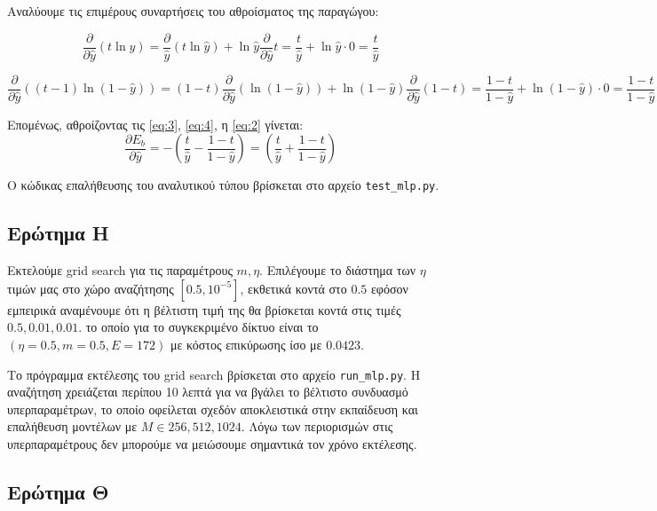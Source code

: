 \documentclass{article}
\newcommand{\code}{\texttt}
\begin{document}
Αναλύουμε τις επιμέρους συναρτήσεις του αθροίσματος της παραγώγου:

\begin{equation}
	\label{eq:3}
	\frac{\partial}{\partial \hat{y}} (t \ln\hat{y}) = \frac{\partial }{\hat{y}} (t\ln\hat{y}) + \ln\hat{y} \frac{\partial}{\partial \hat{y}}t = \frac{t}{\hat{y}} + \ln \hat{y} \cdot 0 = \frac{t}{\hat{y}}
\end{equation}

\begin{equation}
	\label{eq:4}
	\frac{\partial}{\partial \hat{y}} ((t-1) \ln(1-\hat{y})) = (1-t)\frac{\partial}{\partial\hat{y}} (\ln(1-\hat{y})) + \ln(1-\hat{y}) \frac{\partial}{\partial \hat{y}}(1-t) = \frac{1-t}{1-\hat{y}} + \ln(1-\hat{y}) \cdot 0 =\frac{1-t}{1-\hat{y}}
\end{equation}


Επομένως, αθροίζοντας τις \ref{eq:3}, \ref{eq:4}, η \ref{eq:2} γίνεται:
\begin{equation}
	\frac{\partial E_b}{\partial \hat{y}} = - (\frac{t}{\hat{y}} - \frac{1-t}{1-\hat{y}}) = (\frac{t}{\hat{y}} + \frac{1-t}{1 - \hat{y}})
\end{equation}

Ο κώδικας επαλήθευσης του αναλυτικού τύπου βρίσκεται στο αρχείο \code{test\_mlp.py}.


\subsection{Ερώτημα Η}

Εκτελούμε grid search για τις παραμέτρους $m, \eta$. Επιλέγουμε το διάστημα των $\eta$ τιμών μας στο χώρο αναζήτησης $[0.5, 10^{-5}]$, εκθετικά κοντά στο $0.5$ εφόσον εμπειρικά αναμένουμε ότι η βέλτιστη τιμή της θα βρίσκεται κοντά στις τιμές $0.5, 0.01, 0.01$.  το οποίο για το συγκεκριμένο δίκτυο είναι το $(\eta=0.5, m=0.5, E=172)$ με κόστος επικύρωσης ίσο με $0.0423$.

Το πρόγραμμα εκτέλεσης του grid search βρίσκεται στο αρχείο \code{run\_mlp.py}. Η αναζήτηση χρειάζεται περίπου 10 λεπτά για να βγάλει το βέλτιστο συνδυασμό υπερπαραμέτρων, το οποίο οφείλεται σχεδόν αποκλειστικά στην εκπαίδευση και επαλήθευση μοντέλων με $M \in {256, 512, 1024}$. Λόγω των περιορισμών στις υπερπαραμέτρους δεν μπορούμε να μειώσουμε σημαντικά τον χρόνο εκτέλεσης.


\subsection{Ερώτημα Θ}
\end{document}
